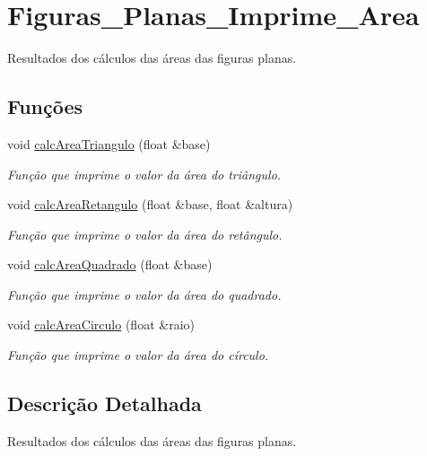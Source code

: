 \hypertarget{group__Figuras__Planas__Imprime__Area}{}\section{Figuras\+\_\+\+Planas\+\_\+\+Imprime\+\_\+\+Area}
\label{group__Figuras__Planas__Imprime__Area}


Resultados dos cálculos das áreas das figuras planas.  


\subsection*{Funções}
\begin{DoxyCompactItemize}
\item 
void \hyperlink{group__Figuras__Planas__Imprime__Area_gac0d6d9fb68ed0e43ad9780f0c86cac51}{calc\+Area\+Triangulo} (float \&base)
\begin{DoxyCompactList}\small\item\em Função que imprime o valor da área do triângulo. \end{DoxyCompactList}\item 
void \hyperlink{group__Figuras__Planas__Imprime__Area_ga1091311f26d5adb888dae930fc1ec7d6}{calc\+Area\+Retangulo} (float \&base, float \&altura)
\begin{DoxyCompactList}\small\item\em Função que imprime o valor da área do retângulo. \end{DoxyCompactList}\item 
void \hyperlink{group__Figuras__Planas__Imprime__Area_gaabb19ec0d92baa5524a15b463f854158}{calc\+Area\+Quadrado} (float \&base)
\begin{DoxyCompactList}\small\item\em Função que imprime o valor da área do quadrado. \end{DoxyCompactList}\item 
void \hyperlink{group__Figuras__Planas__Imprime__Area_gafc4965f40035f915dd29f3a2fe680339}{calc\+Area\+Circulo} (float \&raio)
\begin{DoxyCompactList}\small\item\em Função que imprime o valor da área do círculo. \end{DoxyCompactList}\end{DoxyCompactItemize}


\subsection{Descrição Detalhada}
Resultados dos cálculos das áreas das figuras planas. 



